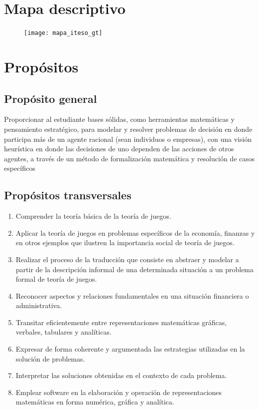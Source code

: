 \documentclass[11pt]{article}
\begin{document}
\section{Mapa descriptivo}

	\begin{figure}[ht]
		\centering
		\texttt{[image: mapa\_iteso\_gt]}
	\end{figure}

\section{Propósitos}

\subsection{Propósito general}

Proporcionar al estudiante bases sólidas, como herramientas matemáticas y pensamiento estratégico, para modelar y resolver problemas de decisión en donde participa más de un agente racional (sean individuos o empresas), con una visión heurística en donde las decisiones de uno dependen de las acciones de otros agentes, a través de un método de formalización matemática y resolución de casos específicos


\subsection{Propósitos transversales}

\begin{tcolorbox}[colback=yelltcol!80]
	\begin{enumerate}[\thesubsection .1]
		\setlength{\itemsep}{0pt}
		\item Comprender la teoría básica de la teoría de juegos.
		\item Aplicar la teoría de juegos en problemas específicos de la economía, finanzas y en otros ejemplos que ilustren la importancia social de teoría de juegos.
		\item Realizar el proceso de la traducción que consiste en abstraer y modelar a partir de la descripción informal de una determinada situación a un problema formal de teoría de juegos.
		\item Reconocer aspectos y relaciones fundamentales en una situación financiera o administrativa.
		\item Transitar eficientemente entre representaciones matemáticas gráficas, verbales, tabulares y analíticas.
		\item Expresar de forma coherente y argumentada las estrategias utilizadas en la solución de problemas.
		\item Interpretar las soluciones obtenidas en el contexto de cada problema.
		\item Emplear software en la elaboración y operación de representaciones matemáticas en forma numérica, gráfica y analítica.
	\end{enumerate}
\end{tcolorbox}
\end{document}
